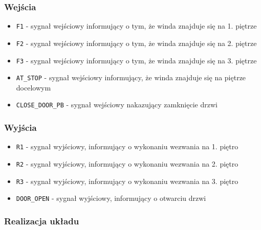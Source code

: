 \documentclass[a4paper]{article}
\begin{document}
\subsubsection{Wejścia}
\begin{itemize}
    \item \verb|F1| - sygnał wejściowy informujący o tym, że winda znajduje się na 1. piętrze 
    \item \verb|F2| - sygnał wejściowy informujący o tym, że winda znajduje się na 2. piętrze
    \item \verb|F3| - sygnał wejściowy informujący o tym, że winda znajduje się na 3. piętrze
    \item \verb|AT_STOP| - sygnał wejściowy informujący, że winda znajduje się na piętrze docelowym
    \item \verb|CLOSE_DOOR_PB| - sygnał wejściowy nakazujący zamknięcie drzwi
\end{itemize}

\subsubsection{Wyjścia}
\begin{itemize}
    \item \verb|R1| - sygnał wyjściowy, informujący o wykonaniu wezwania na 1. piętro
    \item \verb|R2| - sygnał wyjściowy, informujący o wykonaniu wezwania na 2. piętro
    \item \verb|R3| - sygnał wyjściowy, informujący o wykonaniu wezwania na 3. piętro
    \item \verb|DOOR_OPEN| - sygnał wyjściowy, informujący o otwarciu drzwi
\end{itemize}

\subsubsection{Realizacja układu}
\end{document}

